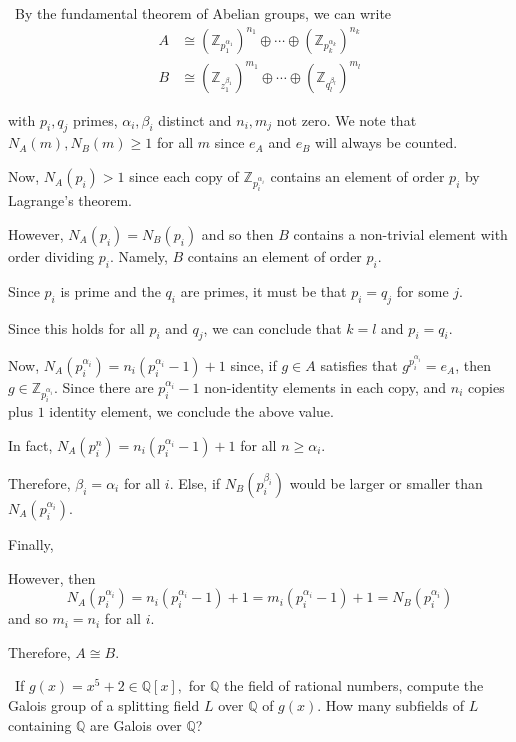 \documentclass[12pt]{Qual}
\begin{document}
\begin{solution}$\,$
By the fundamental theorem of Abelian groups, we can write \begin{align*}
    A&\cong(\mathbb{Z}_{p_1^{\alpha_1}})^{n_1}\oplus\cdots\oplus(\mathbb{Z}_{p_k^{\alpha_k}})^{n_k}\\
    B&\cong(\mathbb{Z}_{z_1^{\beta_1}})^{m_1}\oplus\cdots\oplus(\mathbb{Z}_{q_l^{\beta_l}})^{m_l}
\end{align*}

with $p_i,q_j$ primes, $\alpha_i,\beta_i$ distinct and $n_i,m_j$ not zero. We note that $N_A(m),N_B(m)\ge1$ for all $m$ since $e_A$ and $e_B$ will always be counted.

Now, $N_A(p_i)>1$ since each copy of $\mathbb{Z}_{p_i^{\alpha_i}}$ contains an element of order $p_i$ by Lagrange's theorem.

However, $N_A(p_i)=N_B(p_i)$ and so then $B$ contains a non-trivial element with order dividing $p_i$. Namely, $B$ contains an element of order $p_i$.

Since $p_i$ is prime and the $q_i$ are primes, it must be that $p_i=q_j$ for some $j$.

Since this holds for all $p_i$ and $q_j$, we can conclude that $k=l$ and $p_i=q_i$.

Now, $N_A(p_i^{\alpha_i})=n_i(p_i^{\alpha_i}-1)+1$ since, if $g\in A$ satisfies that $g^{p_i^{\alpha_i}}=e_A$, then $g\in \mathbb{Z}_{p_i^{\alpha_i}}$. Since there are $p_i^{\alpha_i}-1$ non-identity elements in each copy, and $n_i$ copies plus $1$ identity element, we conclude the above value.

In fact, $N_A(p_i^n)=n_i(p_i^{\alpha_i}-1)+1$ for all $n\ge \alpha_i$.

Therefore, $\beta_i=\alpha_i$ for all $i$. Else, if $N_B(p_i^{\beta_i})$ would be larger or smaller than $N_A(p_i^{\alpha_i})$.

Finally,

However, then $$N_A(p_i^{\alpha_i})=n_i(p_i^{\alpha_i}-1)+1=m_i(p_i^{\alpha_i}-1)+1=N_B(p_i^{\alpha_i})$$ and so $m_i=n_i$ for all $i$.

Therefore, $A\cong B.$
\end{solution}
\newpage

\begin{problem} $\,$
If $g(x)=x^5+2\in\mathbb{Q}[x],$ for $\mathbb{Q}$ the field of rational numbers, compute the Galois group of a splitting field $L$ over $\mathbb{Q}$ of $g(x).$ How many subfields of $L$ containing $\mathbb{Q}$ are Galois over $\mathbb{Q}$?
\end{problem}
\end{document}
